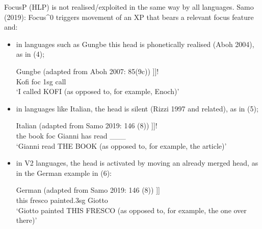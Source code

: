 \documentclass[fleqn,10pt]{wlscirep}
\begin{document}
\noindent FocusP (HLP) is not realised/exploited in the same way by all languages. Samo (2019): Focus^0 triggers movement of an XP that bears a relevant focus feature and:
\begin{itemize}
    \item \vspace*{-2mm} in languages such as Gungbe this head is phonetically realised (Aboh 2004), as in (4);
        \begin{exe}
            \ex Gungbe (adapted from Aboh 2007: 85(9c))
                \gll [\textsubscript{FocusP}  	KÒFÍ\textsubscript{i}   [\textsubscript{Focus^0} 	wè 			[	ùn   		yró		\_\_\_\textsubscript{i}		]]]!\\
                {} Kofi        {} 			foc    {}    	1sg   	call {} {}\\
                \vspace{-3mm}
                \glt ‘I called KOFI (as opposed to, for example, Enoch)’
        \end{exe}

    \item \vspace*{-2mm} in languages like Italian, the head is silent (Rizzi 1997 and related), as in (5);
        \begin{exe}
            \ex Italian (adapted from Samo 2019: 146 (8))
                \gll [\textsubscript{FocusP} 	IL LIBRO\textsubscript{i}	    [\textsubscript{Focus^0} 	$\emptyset$ 		[	Gianni 		ha 		letto 	\_\_\_\textsubscript{i}	]]]!\\
                {} the book				{}		foc		{}	Gianni 		has 	read 	\_\_\_\\
                \vspace{-3mm}
                \glt ‘Gianni read THE BOOK (as opposed to, for example, the article)’	
        \end{exe}

    \item \vspace*{-2mm} in V2 languages, the head is activated by moving an already merged head, as in the German example in (6):
        \begin{exe}
            \ex	German (adapted from Samo 2019: 146 (8))
                \gll [\textsubscript{SpecFoc} 	DIESES 	FRESKO 	[\textsubscript{Focus^0} 	malte				[	Giotto ]]]\\
                {} this 			fresco			{}		painted.3sg	{}	Giotto \\
                \vspace*{-3mm}
                \glt ‘Giotto painted THIS FRESCO (as opposed to, for example, the one over there)’
        \end{exe}

\end{itemize}
\end{document}

